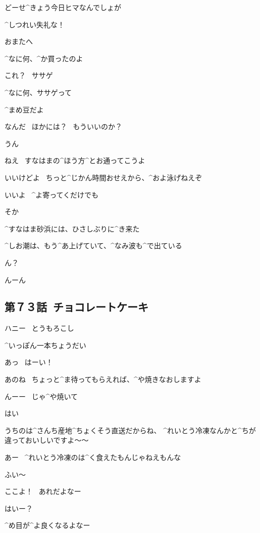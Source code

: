 \Makki どーせ^{きょう}{今日}ヒマなんでしょが

\Takahiro ^{しつれい}{失礼}な！

\page
\Makki おまたへ

\Takahiro ^{なに}{何}、^{か}{買}ったのよ

\Makki これ？
\ ササゲ

\Takahiro ^{なに}{何}、ササゲって

\Makki ^{まめ}{豆}だよ

\Takahiro なんだ
\ ほかには？
\ もういいのか？

\Makki うん

\page
\Makki ねえ
\ すなはまの^{ほう}{方}^{とお}{通}ってこうよ

\Takahiro いいけどよ
\ ちっと^{じかん}{時間}おせえから、^{およ}{泳}げねえぞ

\Makki いいよ
\ ^{よ}{寄}ってくだけでも

\Takahiro そか

\page
\Takahiro ^{すなはま}{砂浜}には、ひさしぶりに^{き}{来}た

\Takahiro ^{しお}{潮}は、もう^{あ}{上}げていて、^{なみ}{波}も^{で}{出}ている

\page[102]
\Makki ん？

\Takahiro んーん


\subsection{第７３話\ チョコレートケーキ}

\page[104]
\Sign ハニー
\ とうもろこし

\Person ^{いっぽん}{一本}ちょうだい

\Alpha あっ
\ はーい！

\page
\Alpha あのね
\ ちょっと^{ま}{待}ってもらえれば、^{や}{焼}きなおしますよ

\Person んーー
\ じゃ^{や}{焼}いて

\Alpha はい

\Alpha うちのは^{さんち}{産地}^{ちょくそう}{直送}だからね、
^{れいとう}{冷凍}なんかと^{ちが}{違}っておいしいですよ〜〜

\Person あー
\ ^{れいとう}{冷凍}のは^{く}{食}えたもんじゃねえもんな

\Person ふい〜

\Person ここよ！
\ あれだよなー

\Alpha はいー？

\page
\Person ^{め}{目}が^{よ}{良}くなるよなー

